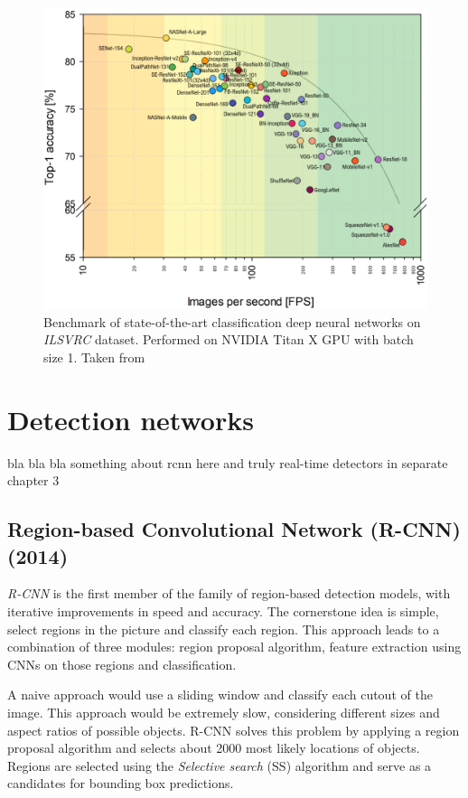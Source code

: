 \begin{figure}
    \includegraphics[width=\textwidth]{img/fps_comp}
    \caption{Benchmark of state-of-the-art classification deep neural networks on \textit{ILSVRC} dataset. Performed on NVIDIA
Titan X GPU with batch size 1. Taken from \cite[fig. 3]{bib:cnnbenchmark}}
    \label{fig:cnnbenchmark}
\end{figure}



\section{Detection networks}
\label{sec:detnets}
bla bla bla
something about rcnn here and truly real-time detectors in separate chapter 3

\subsection{Region-based Convolutional Network (R-CNN) (2014)}
\textit{R-CNN} \cite{bib:rcnn} is the first member of the family of region-based detection models, with iterative improvements in speed and accuracy. The cornerstone idea is simple, select regions in the picture and classify each region. This approach leads to a combination of three modules: region proposal algorithm, feature extraction using CNNs on those regions and classification. 

A naive approach would use a sliding window and classify each cutout of the image.  This approach would be extremely slow, considering different sizes and aspect ratios of possible objects. R-CNN solves this problem by applying a region proposal algorithm and selects about 2000 most likely locations of objects. Regions are selected using the \textit{Selective search} (SS) \cite{bib:selectivesearch} algorithm and serve as a candidates for bounding box predictions.

